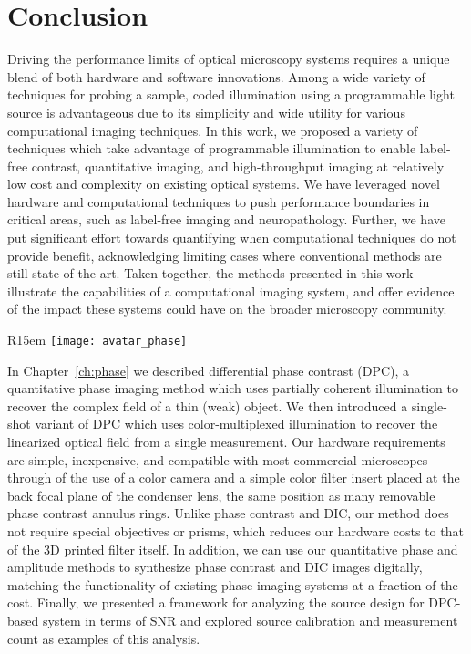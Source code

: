 \chapter{Conclusion}\label{ch:conclusion}
Driving the performance limits of optical microscopy systems requires a unique blend of both hardware and software innovations. Among a wide variety of techniques for probing a sample, coded illumination using a programmable light source is advantageous due to its simplicity and wide utility for various computational imaging techniques. In this work, we proposed a variety of techniques which take advantage of programmable illumination to enable label-free contrast, quantitative imaging, and high-throughput imaging at relatively low cost and complexity on existing optical systems. We have leveraged novel hardware and computational techniques to push performance boundaries in critical areas, such as label-free imaging and neuropathology. Further, we have put significant effort towards quantifying when computational techniques do not provide benefit, acknowledging limiting cases where conventional methods are still state-of-the-art. Taken together, the methods presented in this work illustrate the capabilities of a computational imaging system, and offer evidence of the impact these systems could have on the broader microscopy community.

\begin{wrapfigure}{R}{15em}
  \texttt{[image: avatar\_phase]}
\end{wrapfigure}

In Chapter~\ref{ch:phase} we described differential phase contrast (DPC), a quantitative phase imaging method which uses partially coherent illumination to recover the complex field of a thin (weak) object. We then introduced a single-shot variant of DPC which uses  color-multiplexed illumination to recover the linearized optical field from a single measurement. Our hardware requirements are simple, inexpensive, and compatible with most commercial microscopes through of the use of a color camera and a simple color filter insert placed at the back focal plane of the condenser lens, the same position as many removable phase contrast annulus rings. Unlike phase contrast and DIC, our method does not require special objectives or prisms, which reduces our hardware costs to that of the 3D printed filter itself. In addition, we can use our quantitative phase and amplitude methods to synthesize phase contrast and DIC images digitally, matching the functionality of existing phase imaging systems at a fraction of the cost. Finally, we presented a framework for analyzing the source design for DPC-based system in terms of SNR and explored source calibration and measurement count as examples of this analysis.

